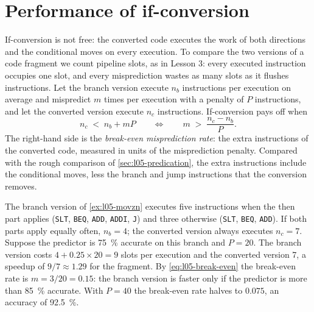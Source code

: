 \documentclass[../main.tex]{subfiles}
\begin{document}
\section{Performance of if-conversion}
\label{sec:l05-performance}

If-conversion is not free: the converted code executes the work of both
directions and the conditional moves on every execution.  To compare the two versions of a code fragment we
count pipeline slots, as in Lesson 3: every executed instruction occupies one
slot, and every misprediction wastes as many slots as it flushes instructions.
Let the branch version execute $n_b$ instructions per execution on average
and mispredict $m$ times per execution with a penalty of $P$ instructions, and
let the converted version execute $n_c$ instructions.
If-conversion pays off when
\begin{equation}
  n_c \;<\; n_b + mP
  \qquad\Longleftrightarrow\qquad
  m \;>\; \frac{n_c - n_b}{P} .
  \label{eq:l05-break-even}
\end{equation}
The right-hand side is the \emph{break-even misprediction rate}: the extra
instructions of the converted code, measured in units of the misprediction
penalty.  Compared with the rough comparison of
\cref{sec:l05-predication}, the extra instructions include the conditional
moves, less the branch and jump instructions that the conversion removes.

\begin{example}
  \label{ex:l05-performance}
  The branch version of \cref{ex:l05-movzn} executes five instructions when
  the then part applies (\texttt{SLT}, \texttt{BEQ}, \texttt{ADD},
  \texttt{ADDI}, \texttt{J}) and three otherwise (\texttt{SLT}, \texttt{BEQ},
  \texttt{ADD}).  If both parts apply equally often, $n_b = 4$; the converted
  version always executes $n_c = 7$.  Suppose the predictor is
  \SI{75}{\percent} accurate on this branch and $P = 20$.  The branch version
  costs $4 + 0.25 \times 20 = 9$ slots per execution and the converted
  version 7, a speedup of $9/7 \approx 1.29$ for the fragment.  By
  \cref{eq:l05-break-even} the break-even rate is $m = 3/20 = 0.15$: the
  branch version is faster only if the predictor is more than
  \SI{85}{\percent} accurate.  With $P = 40$ the break-even rate halves to
  $0.075$, an accuracy of \SI{92.5}{\percent}.
\end{example}
\end{document}
